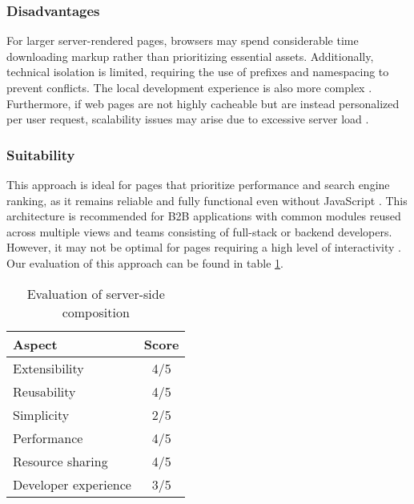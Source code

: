 \subsubsection{Disadvantages}
For larger server-rendered pages, browsers may spend considerable time downloading markup rather than prioritizing essential assets. Additionally, technical isolation is limited, requiring the use of prefixes and namespacing to prevent conflicts. The local development experience is also more complex \cite{Geers}. Furthermore, if web pages are not highly cacheable but are instead personalized per user request, scalability issues may arise due to excessive server load \cite{Peltonen}.

\subsubsection{Suitability}
This approach is ideal for pages that prioritize performance and search engine ranking, as it remains reliable and fully functional even without JavaScript \cite{Geers}. This architecture is recommended for B2B applications with common modules reused across multiple views and teams consisting of full-stack or backend developers. However, it may not be optimal for pages requiring a high level of interactivity \cite{MezzaliraBuildingMf}. Our evaluation of this approach can be found in table \ref{table:ssi-evaluation}.

\begin{table}[h]
  \centering
  \begin{tabular}{|p{4cm}|c|}
     \hline
        \textbf{Aspect} & \textbf{Score} \\
     \hline
        Extensibility & 4/5 \\
     \hline
        Reusability & 4/5 \\
     \hline
        Simplicity & 2/5 \\
     \hline
        Performance & 4/5 \\
     \hline
        Resource sharing & 4/5 \\
     \hline
        Developer experience & 3/5 \\
     \hline
  \end{tabular}
  \caption{Evaluation of server-side composition}
  \label{table:ssi-evaluation}
\end{table}


